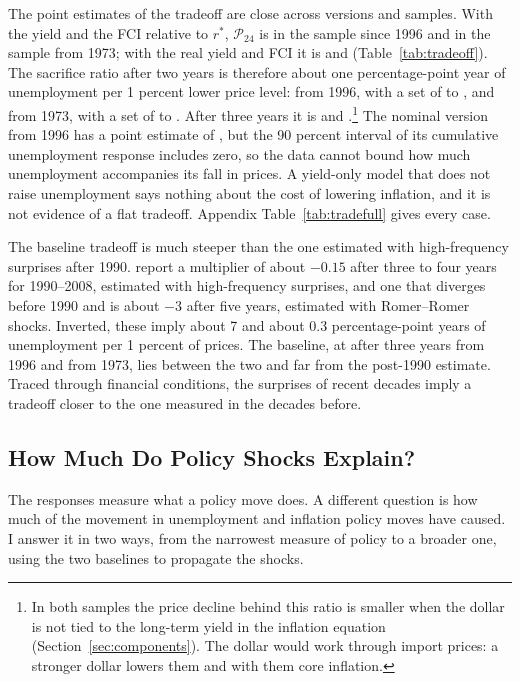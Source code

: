 \documentclass[11pt]{article}
\newcommand{\rs}{r^{*}}
\begin{document}


The point estimates of the tradeoff are close across versions and samples. With the yield and the FCI relative to $\rs$, $\mathcal{P}_{24}$ is  in the sample since 1996 and  in the sample from 1973; with the real yield and FCI it is  and  (Table~\ref{tab:tradeoff}). The sacrifice ratio after two years is therefore about one percentage-point year of unemployment per 1 percent lower price level:  from 1996, with a set of  to , and  from 1973, with a set of  to . After three years it is  and .\footnote{In both samples the price decline behind this ratio is smaller when the dollar is not tied to the long-term yield in the inflation equation (Section~\ref{sec:components}). The dollar would work through import prices: a stronger dollar lowers them and with them core inflation.} The nominal version from 1996 has a point estimate of , but the 90 percent interval of its cumulative unemployment response includes zero, so the data cannot bound how much unemployment accompanies its fall in prices. A yield-only model that does not raise unemployment says nothing about the cost of lowering inflation, and it is not evidence of a flat tradeoff. Appendix Table~\ref{tab:tradefull} gives every case.

The baseline tradeoff is much steeper than the one estimated with high-frequency surprises after 1990. \citet{barnichon2021} report a multiplier of about $-0.15$ after three to four years for 1990--2008, estimated with high-frequency surprises, and one that diverges before 1990 and is about $-3$ after five years, estimated with Romer--Romer shocks. Inverted, these imply about 7 and about 0.3 percentage-point years of unemployment per 1 percent of prices. The baseline, at  after three years from 1996 and  from 1973, lies between the two and far from the post-1990 estimate. Traced through financial conditions, the surprises of recent decades imply a tradeoff closer to the one measured in the decades before.

\subsection{How Much Do Policy Shocks Explain?}\label{sec:shares}
The responses measure what a policy move does. A different question is how much of the movement in unemployment and inflation policy moves have caused. I answer it in two ways, from the narrowest measure of policy to a broader one, using the two baselines to propagate the shocks.
\end{document}
